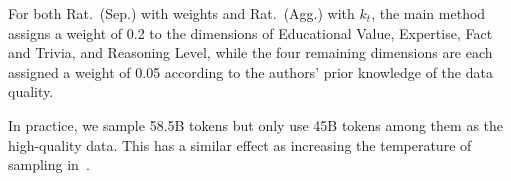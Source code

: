 \documentclass[11pt]{article}
\begin{document}
For both Rat.\ (Sep.) with weights and Rat.\ (Agg.) with $k_t$, the main method assigns a weight of 0.2 to the dimensions of Educational Value, Expertise, Fact and Trivia, and Reasoning Level, while the four remaining dimensions are each assigned a weight of 0.05  according to the authors' prior knowledge of the data quality. %

In practice, we sample 58.5B tokens but only use 45B tokens among them as the high-quality data. This has a similar effect as increasing the temperature of sampling in~\citep{wettig2024qurating}.
%

\end{document}
